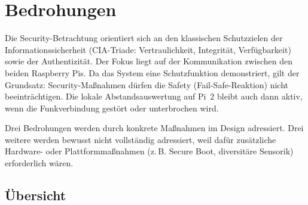 \clearpage
\section{Bedrohungen}
\label{sec:security}

Die Security-Betrachtung orientiert sich an den klassischen Schutzzielen der
Informationssicherheit (CIA-Triade: Vertraulichkeit, Integrität,
Verfügbarkeit) sowie der Authentizität. Der Fokus liegt auf der
Kommunikation zwischen den beiden Raspberry Pis. Da das System eine
Schutzfunktion demonstriert, gilt der Grundsatz: Security-Maßnahmen dürfen die
Safety (Fail-Safe-Reaktion) nicht beeinträchtigen. Die lokale
Abstandsauswertung auf Pi~2 bleibt auch dann aktiv, wenn die Funkverbindung
gestört oder unterbrochen wird.

Drei Bedrohungen werden durch konkrete Maßnahmen im Design adressiert. Drei weitere werden bewusst
nicht vollständig adressiert, weil dafür zusätzliche Hardware- oder
Plattformmaßnahmen (z.\,B. Secure Boot, diversitäre Sensorik) erforderlich wären.

\subsection{Übersicht}

